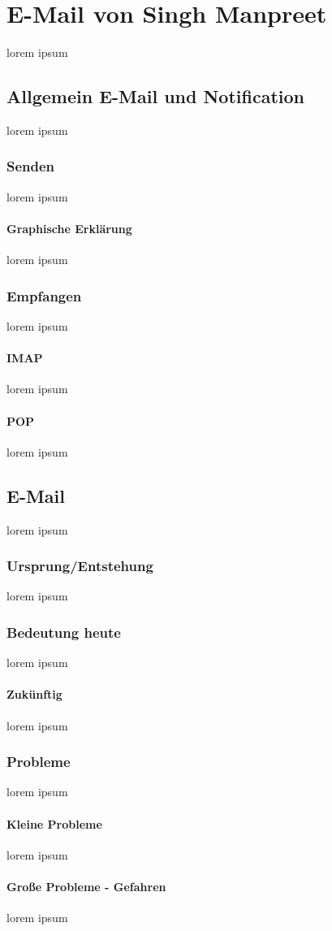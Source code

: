\documentclass[12pt,a4paper]{report}
\begin{document}
\section{E-Mail von Singh Manpreet}
lorem ipsum
\subsection{Allgemein E-Mail und Notification}
lorem ipsum
\subsubsection{Senden}
lorem ipsum
\paragraph{Graphische Erklärung}
lorem ipsum
\subsubsection{Empfangen}
lorem ipsum
\paragraph{IMAP}
lorem ipsum
\paragraph{POP}
lorem ipsum
\subsection{E-Mail}
lorem ipsum
\subsubsection{Ursprung/Entstehung}
lorem ipsum
\subsubsection{Bedeutung heute}
lorem ipsum
\paragraph{Zukünftig}
lorem ipsum
\subsubsection{Probleme}
lorem ipsum
\paragraph{Kleine Probleme}
lorem ipsum
\paragraph{Große Probleme - Gefahren}
lorem ipsum
\end{document}
